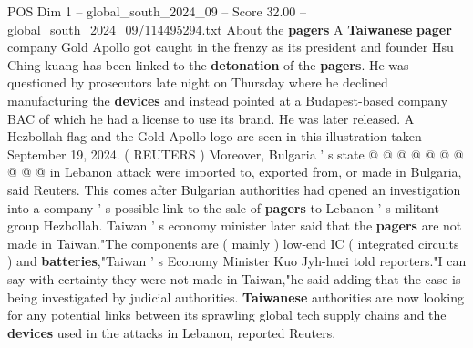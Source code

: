 \begin{textsample}{POS Dim 1 – global\_south\_2024\_09 – Score 32.00 – global\_south\_2024\_09/114495294.txt}
About the \textbf{pagers} A \textbf{Taiwanese} \textbf{pager} company Gold Apollo got caught in the frenzy as its president and founder Hsu Ching-kuang has been linked to the \textbf{detonation} of the \textbf{pagers}.
He was questioned by prosecutors late night on Thursday where he declined manufacturing the \textbf{devices} and instead pointed at a Budapest-based company BAC of which he had a license to use its brand.
He was later released.
A Hezbollah flag and the Gold Apollo logo are seen in this illustration taken September 19, 2024. ( REUTERS ) Moreover, Bulgaria ' s state @ @ @ @ @ @ @ @ @ @ in Lebanon attack were imported to, exported from, or made in Bulgaria, said Reuters.
This comes after Bulgarian authorities had opened an investigation into a company ' s possible link to the sale of \textbf{pagers} to Lebanon ' s militant group Hezbollah.
Taiwan ' s economy minister later said that the \textbf{pagers} are not made in Taiwan."The components are ( mainly ) low-end IC ( integrated circuits ) and \textbf{batteries},"Taiwan ' s Economy Minister Kuo Jyh-huei told reporters."I can say with certainty they were not made in Taiwan,"he said adding that the case is being investigated by judicial authorities. \textbf{Taiwanese} authorities are now looking for any potential links between its sprawling global tech supply chains and the \textbf{devices} used in the attacks in Lebanon, reported Reuters.

\end{textsample}
